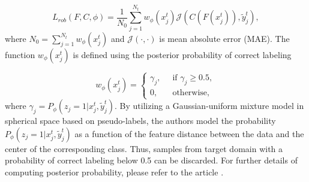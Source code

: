 \begin{equation}
L_{rob}(F, C, \phi) = \dfrac{1}{N_0}\sum_{j=1}^{N_t} w_\phi(x_j^t) \mathcal{J}(C(F(x_j^t)), \tilde{y}_j^t),
\end{equation}
where $N_0 = \sum_{j=1}^{N_t} w_\phi(x_j^t)$ and $\mathcal{J}(\cdot, \cdot)$ is mean absolute error (MAE). The function $w_\phi (x_j^t)$ is defined using the posterior probability of correct labeling 

\begin{equation}
w_\phi(x_j^t) = \left\{\begin{split}
\gamma_j,& \;\; \text{if } \gamma_j \geq 0.5,\\
0,& \;\; \text{otherwise},
\end{split}\right.
\end{equation}
where $\gamma_j = P_\phi(z_j = 1| x_j^t, \tilde{y}_j^t)$. By utilizing a Gaussian-uniform mixture model in spherical space based on pseudo-labels, the authors model the probability $P_\phi(z_j = 1| x_j^t, \tilde{y}_j^t)$ as a function of the feature distance between the data and the center of the corresponding class. Thus, samples from target domain with a probability of correct labeling below 0.5 can be discarded. For further details of computing posterior probability, please refer to the article \cite{gu2020spherical}.  